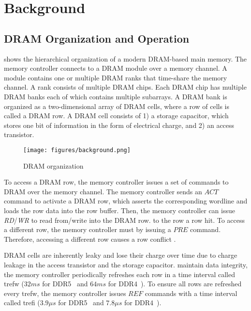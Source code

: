 \section{Background}
\label{sec:background}
\subsection{DRAM Organization and Operation}
\label{sec:dram_organization}

 shows the hierarchical organization of a modern DRAM-based main memory. The memory controller connects to a DRAM module over a memory channel. A module contains one or multiple DRAM ranks that time-share the memory channel.
A rank consists of multiple DRAM chips.
Each DRAM chip has multiple DRAM banks each of which contains multiple subarrays. A DRAM bank is organized as a two-dimensional array of DRAM cells, where a row of cells is called a DRAM row. A DRAM cell consists of 1) a storage capacitor, which stores one bit of information in the form of electrical charge, and 2) an access transistor.

\begin{figure}[ht]
    \centering
    \texttt{[image: figures/background.png]}
    \caption{DRAM organization}
    \label{fig:dram_organization}
\end{figure}

To access a DRAM row, the memory controller issues a set of commands to DRAM over the memory channel. The memory controller sends an $ACT$ command to activate a DRAM row, which asserts the corresponding wordline and loads the row data into the row buffer. Then, the memory controller can issue \emph{RD}/\emph{WR}  to read from/write into the DRAM row.
 to the row  a row hit.
To access a different row, the memory controller must  by issuing a $PRE$ command.
Therefore, accessing a different row  causes a row conflict .

DRAM cells are inherently leaky and lose their charge over time due to charge leakage in the access transistor and the storage capacitor.
 maintain data integrity, the memory controller periodically refreshes each row in a time interval called \gls{trefw} ($32 ms$ for DDR5~\cite{jedec2020ddr5} and $64 ms$ for DDR4~\cite{jedec2017ddr4}).
To ensure all rows are refreshed every \gls{trefw}, the memory controller issues $REF$ commands with a time interval called \gls{trefi} ($3.9 \mu s$ for DDR5~\cite{jedec2020ddr5} and $7.8 \mu s$ for DDR4~\cite{jedec2017ddr4}).

